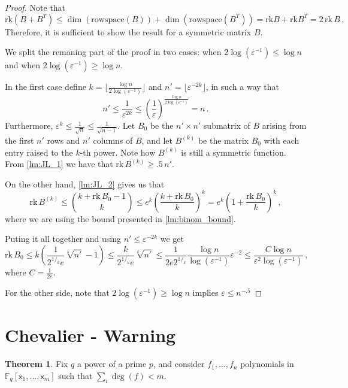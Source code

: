 \documentclass[12pt]{amsart}
\theoremstyle{definition}
\newtheorem{thm}{Theorem}[section]
\newcommand{\F}{\mathbb{F}}
\newcommand{\vx}{\mathsf{x}}
\newcommand{\rk}{\mathrm{rk}}
\begin{document}
\begin{proof}
Note that 
$$\rk(B + B^T) \leq \dim( \mathrm{rowspace}(B) ) + \dim( \mathrm{rowspace}(B^T) ) =  \rk B + \rk B^T  = 2 \, \rk \, B\, . $$ 
Therefore, it is sufficient to show the result for a symmetric matrix $B$.

We split the remaning part of the proof in two cases: when $2 \log(\varepsilon^{-1}) \leq \log n$ and when $2 \log(\varepsilon^{-1}) \geq \log n$.

In the first case define $k = \lfloor \frac{\log n}{2 \log ( \varepsilon^{-1})} \rfloor$ and $n' = \lfloor \varepsilon^{-2k} \rfloor$, in such a way that 
$$ n' \leq \frac{1}{\varepsilon^{2k}} \leq \left( \frac{1}{\varepsilon} \right)^{\frac{\log n}{2 \log(\varepsilon^{-1})}} = n\, . $$
Furthermore, $\varepsilon^k \leq \frac{1}{\sqrt{n}} \leq \frac{1}{\sqrt{n-1}}$.
Let $B_0$ be the $n'\times n'$ submatrix of $B$ arising from the first $n'$ rows and $n'$ columns of $B$, and let $B^{(k)}$ be the matrix $B_0$ with each entry raised to the $k$-th power.
Note how $B^{(k)}$ is still a symmetric function.
From \cref{lm:JL_1} we have that $\rk \, B^{(k)} \geq .5 \, n'$.

On the other hand, \cref{lm:JL_2} gives us that 
$$\rk \, B^{(k)} \leq \binom{k + \rk\, B_0 - 1}{k} \leq e^k \left( \frac{k + \rk \, B_0}{k}\right)^k =  e^k \left(1 +  \frac{\rk \, B_0}{k}\right)^k\, , $$
where we are using the bound presented in \cref{lm:binom_bound}.

Puting it all together and using $n' \leq \varepsilon^{-2k}$ we get 
$$ \rk \, B_0 \leq k \left( \frac{1}{2^{1/_k} e} \sqrt[k]{n'} - 1\right)  \leq  \frac{k}{2^{1/_k} e} \sqrt[k]{n'} \leq \frac{1}{2e  2^{1/_k} }\frac{\log n}{\log(\varepsilon^{-1})}\varepsilon^{-2} \leq \frac{C \log n}{\varepsilon^2 \log(\varepsilon^{-1})}\, , $$
where $C = \frac{1}{2e}$.

For the other side, note that $2 \log(\varepsilon^{-1}) \geq \log n$ implies $\varepsilon \leq n^{-.5}$

\end{proof}





\section{Chevalier - Warning}%

\begin{thm}
Fix $q$ a power of a prime $p$, and consider $f_1, \ldots, f_n$ polynomials in $\F_q[\vx_1, \ldots , \vx_m]$ such that $\sum_i \deg (f) < m$.



\end{thm}
\end{document}
